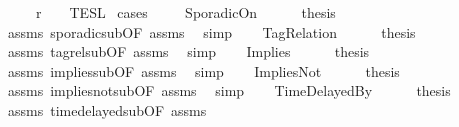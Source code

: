 \begin{isabellebody}
\ \ \ \ \ {\isacartoucheopen}r\ {\isasymin}\ {\isasymlbrakk}\ {\isasymphi}\ {\isasymrbrakk}\isactrlsub T\isactrlsub E\isactrlsub S\isactrlsub L{\isacartoucheclose}\isanewline
%
\isadelimproof
%
\endisadelimproof
%
\isatagproof
{}\isamarkupfalse%
\ {\isacharparenleft}cases\ {\isasymphi}{\isacharparenright}\isanewline
\ \ \isamarkupfalse%
\ {\isacharparenleft}SporadicOn{\isacharparenright}\isanewline
\ \ \ \ \isamarkupfalse%
\ {\isacharquery}thesis\ \isamarkupfalse%
\ assms{\isacharparenleft}{}{\isacharparenright}\ sporadic{\isacharunderscore}sub{\isacharbrackleft}OF\ assms{\isacharparenleft}{}{\isacharparenright}{\isacharbrackright}\ \isamarkupfalse%
\ simp\isanewline
{}\isamarkupfalse%
\isanewline
\ \ \isamarkupfalse%
\ {\isacharparenleft}TagRelation{\isacharparenright}\isanewline
\ \ \ \ \isamarkupfalse%
\ {\isacharquery}thesis\ \isamarkupfalse%
\ assms{\isacharparenleft}{}{\isacharparenright}\ tagrel{\isacharunderscore}sub{\isacharbrackleft}OF\ assms{\isacharparenleft}{}{\isacharparenright}{\isacharbrackright}\ \isamarkupfalse%
\ simp\isanewline
{}\isamarkupfalse%
\isanewline
\ \ \isamarkupfalse%
\ {\isacharparenleft}Implies{\isacharparenright}\isanewline
\ \ \ \ \isamarkupfalse%
\ {\isacharquery}thesis\ \isamarkupfalse%
\ assms{\isacharparenleft}{}{\isacharparenright}\ implies{\isacharunderscore}sub{\isacharbrackleft}OF\ assms{\isacharparenleft}{}{\isacharparenright}{\isacharbrackright}\ \isamarkupfalse%
\ simp\isanewline
{}\isamarkupfalse%
\isanewline
\ \ \isamarkupfalse%
\ {\isacharparenleft}ImpliesNot{\isacharparenright}\isanewline
\ \ \ \ \isamarkupfalse%
\ {\isacharquery}thesis\ \isamarkupfalse%
\ assms{\isacharparenleft}{}{\isacharparenright}\ implies{\isacharunderscore}not{\isacharunderscore}sub{\isacharbrackleft}OF\ assms{\isacharparenleft}{}{\isacharparenright}{\isacharbrackright}\ \isamarkupfalse%
\ simp\isanewline
{}\isamarkupfalse%
\isanewline
\ \ \isamarkupfalse%
\ {\isacharparenleft}TimeDelayedBy{\isacharparenright}\isanewline
\ \ \ \ \isamarkupfalse%
\ {\isacharquery}thesis\ \isamarkupfalse%
\ assms{\isacharparenleft}{}{\isacharparenright}\ time{\isacharunderscore}delayed{\isacharunderscore}sub{\isacharbrackleft}OF\ assms{\isacharparenleft}{}{\isacharparenright}{\isacharbrackright}\ \isamarkupfalse%

\end{isabellebody}
